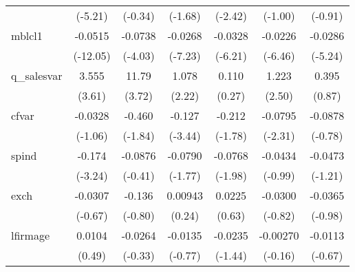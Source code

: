 \begin{table}[htbp]
\begin{tabular}{l*{6}{c}}
                    &     (-5.21)         &     (-0.34)         &     (-1.68)         &     (-2.42)         &     (-1.00)         &     (-0.91)         \\
\addlinespace
mblcl1              &     -0.0515\sym{***}&     -0.0738\sym{***}&     -0.0268\sym{***}&     -0.0328\sym{***}&     -0.0226\sym{***}&     -0.0286\sym{***}\\
                    &    (-12.05)         &     (-4.03)         &     (-7.23)         &     (-6.21)         &     (-6.46)         &     (-5.24)         \\
\addlinespace
q\_salesvar          &       3.555\sym{***}&       11.79\sym{***}&       1.078\sym{*}  &       0.110         &       1.223\sym{*}  &       0.395         \\
                    &      (3.61)         &      (3.72)         &      (2.22)         &      (0.27)         &      (2.50)         &      (0.87)         \\
\addlinespace
cfvar               &     -0.0328         &      -0.460         &      -0.127\sym{***}&      -0.212         &     -0.0795\sym{*}  &     -0.0878         \\
                    &     (-1.06)         &     (-1.84)         &     (-3.44)         &     (-1.78)         &     (-2.31)         &     (-0.78)         \\
\addlinespace
spind               &      -0.174\sym{**} &     -0.0876         &     -0.0790         &     -0.0768\sym{*}  &     -0.0434         &     -0.0473         \\
                    &     (-3.24)         &     (-0.41)         &     (-1.77)         &     (-1.98)         &     (-0.99)         &     (-1.21)         \\
\addlinespace
exch                &     -0.0307         &      -0.136         &     0.00943         &      0.0225         &     -0.0300         &     -0.0365         \\
                    &     (-0.67)         &     (-0.80)         &      (0.24)         &      (0.63)         &     (-0.82)         &     (-0.98)         \\
\addlinespace
lfirmage            &      0.0104         &     -0.0264         &     -0.0135         &     -0.0235         &    -0.00270         &     -0.0113         \\
                    &      (0.49)         &     (-0.33)         &     (-0.77)         &     (-1.44)         &     (-0.16)         &     (-0.67)         \\

\end{tabular}
\end{table}

